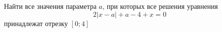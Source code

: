 \begin{ex}
	\begin{condition}
		Найти все значения параметра \( a \), при которых все решения уравнения
		\[ 2|x-a|+a-4+x=0 \] принадлежат отрезку \( [0;4] \)
	\end{condition}
\end{ex}